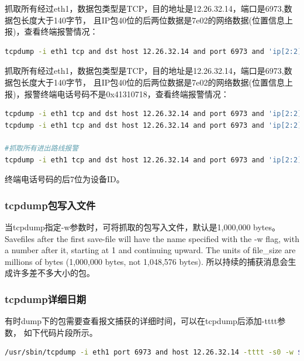 \documentclass{book}
\begin{document}
抓取所有经过eth1，数据包类型是TCP，目的地址是12.26.32.14，端口是6973,数据包长度大于140字节，
且IP包40位的后两位数据是7e02的网络数据(位置信息上报)，查看终端报警情况：

\begin{lstlisting}[language=Bash]
tcpdump -i eth1 tcp and dst host 12.26.32.14 and port 6973 and 'ip[2:2]>0 and ip[41:2]=0x0200 and ip[53:4]!=0x00000000' -vv -X -c 100
\end{lstlisting}

抓取所有经过eth1，数据包类型是TCP，目的地址是12.26.32.14，端口是6973,数据包长度大于140字节，
且IP包40位的后两位数据是7e02的网络数据(位置信息上报)，报警终端电话号码不是0x41310718，查看终端报警情况：

\begin{lstlisting}[language=Bash]
tcpdump -i eth1 tcp and dst host 12.26.32.14 and port 6973 and 'ip[2:2]>0 and ip[41:2]=0x0200 and ip[53:4]!=0x00000000 and ip[46:4]!=0x41310718' -vv -X -c 100
tcpdump -i eth1 tcp and dst host 12.26.32.14 and port 6973 and 'ip[2:2]>100 and ip[41:2]=0x0200 and ip[53:4]==0x200000 and ip[46:4]!=0x41310718' -vv -X -c 10000

#抓取所有进出路线报警
tcpdump -i eth1 tcp and dst host 12.26.32.14 and port 6973 and 'ip[2:2]>0 and ip[41:2]=0x0200 and ip[53:4]==0x00100000' -vv -X -c 100
\end{lstlisting}

终端电话号码的后7位为设备ID。

\subsubsection{tcpdump包写入文件}

当tcpdump指定-w参数时，可将抓取的包写入文件，默认是1,000,000 bytes。
Savefiles after the first  save-file  will  have  the name specified with the -w flag, 
with a number after it, starting at 1 and continuing upward.  
The units of file\_size are millions of bytes (1,000,000 bytes, not 1,048,576 bytes).
所以持续的捕获消息会生成许多差不多大小的包。

\subsubsection{tcpdump详细日期}

有时dump下的包需要查看报文捕获的详细时间，可以在tcpdump后添加-tttt参数，
如下代码片段所示。

\begin{lstlisting}[language=Bash]
/usr/sbin/tcpdump -i eth1 port 6973 and host 12.26.32.14 -tttt -s0 -w $packageStoreDir/$currentTime.cap
\end{lstlisting}
\end{document}
